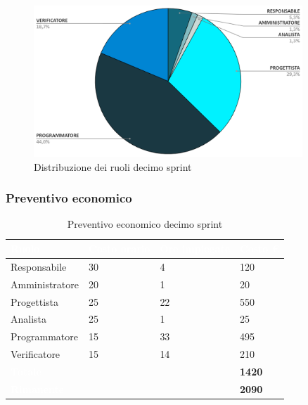 \begin{figure}[h!]
    \centering
    \includegraphics[width=0.9\textwidth]{prev10ruoli.png}
    \caption{Distribuzione dei ruoli decimo sprint}
    \label{fig:preventivoorariodecimosprint}
\end{figure}


\newpage

\subsubsection{Preventivo economico}

{
\setlength{\tabcolsep}{10pt}
\renewcommand{\arraystretch}{1.5}
\begin{table}[h]
    \centering
    \begin{tabularx}{\textwidth}{| l | l | l | X |}
        \hline
        \rowcolor{headerrow} \textbf{\textcolor{white}{Ruolo}} & \textbf{\textcolor{white}{Costo orario}} & \textbf{\textcolor{white}{Ore impiegate}} & \textbf{\textcolor{white}{Costo €}} \\
        \hline
        Responsabile & 30 & 4 & 120\\
        \hline
        Amministratore & 20 & 1 & 20\\
        \hline
        Progettista& 25 & 22 & 550\\
        \hline
        Analista & 25 & 1 & 25\\
        \hline
        Programmatore & 15 & 33 & 495\\
        \hline
        Verificatore & 15 & 14 & 210\\
        \hline
        \cellcolor{headerrow} \textbf{\textcolor{white}{Totale}} &  &  & \textbf{1420}\\
        \hline
        \cellcolor{headerrow} \textbf{\textcolor{white}{Rimanente}} &  &  & \textbf{2090}\\
        \hline
    \end{tabularx}
    \caption{Preventivo economico decimo sprint}
    \label{tab:preventivocostidecimosprint}
\end{table}
}

